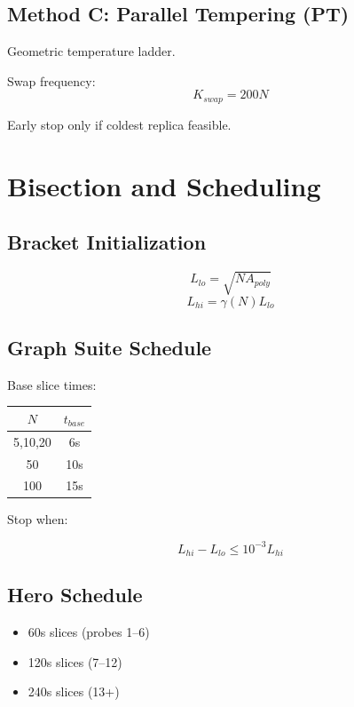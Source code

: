 \documentclass[11pt]{report}
\begin{document}
\section{Method C: Parallel Tempering (PT)}

Geometric temperature ladder.

Swap frequency:
\[
K_{swap} = 200N
\]

Early stop only if coldest replica feasible.

\chapter{Bisection and Scheduling}

\section{Bracket Initialization}

\[
L_{lo} = \sqrt{N A_{poly}}
\]
\[
L_{hi} = \gamma(N) L_{lo}
\]

\section{Graph Suite Schedule}

Base slice times:

\begin{center}
\begin{tabular}{cc}
\toprule
$N$ & $t_{base}$ \\
\midrule
5,10,20 & 6s \\
50 & 10s \\
100 & 15s \\
\bottomrule
\end{tabular}
\end{center}

Stop when:

\[
L_{hi} - L_{lo} \le 10^{-3} L_{hi}
\]

\section{Hero Schedule}

\begin{itemize}
    \item 60s slices (probes 1–6)
    \item 120s slices (7–12)
    \item 240s slices (13+)
\end{itemize}
\end{document}
